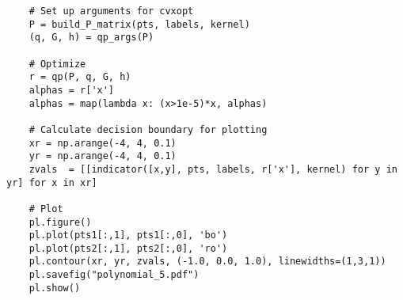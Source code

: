 \documentclass{article}
\begin{document}
\begin{verbatim}
    # Set up arguments for cvxopt
    P = build_P_matrix(pts, labels, kernel)
    (q, G, h) = qp_args(P)

    # Optimize
    r = qp(P, q, G, h)
    alphas = r['x']
    alphas = map(lambda x: (x>1e-5)*x, alphas)

    # Calculate decision boundary for plotting
    xr = np.arange(-4, 4, 0.1)
    yr = np.arange(-4, 4, 0.1)
    zvals  = [[indicator([x,y], pts, labels, r['x'], kernel) for y in yr] for x in xr]

    # Plot
    pl.figure()
    pl.plot(pts1[:,1], pts1[:,0], 'bo')
    pl.plot(pts2[:,1], pts2[:,0], 'ro')
    pl.contour(xr, yr, zvals, (-1.0, 0.0, 1.0), linewidths=(1,3,1))
    pl.savefig("polynomial_5.pdf")
    pl.show()
    \end{verbatim}
\end{document}
